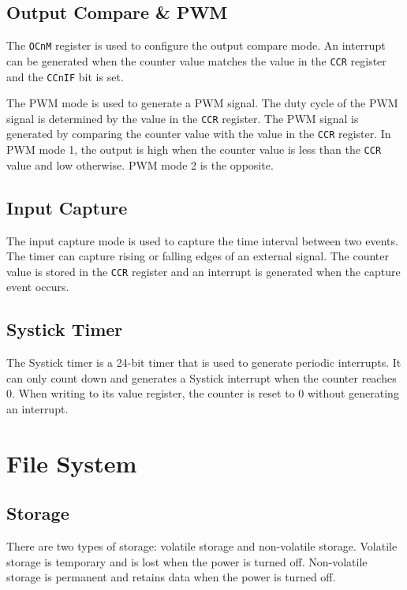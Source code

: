 \documentclass[a4paper,12pt]{article}
\begin{document}
\subsection{Output Compare \& PWM}

The \texttt{OCnM} register is used to configure the output compare mode. An interrupt can be generated when the counter value matches the value in the \texttt{CCR} register and the \texttt{CCnIF} bit is set.

The PWM mode is used to generate a PWM signal. The duty cycle of the PWM signal is determined by the value in the \texttt{CCR} register. The PWM signal is generated by comparing the counter value with the value in the \texttt{CCR} register. In PWM mode 1, the output is high when the counter value is less than the \texttt{CCR} value and low otherwise. PWM mode 2 is the opposite.

\subsection{Input Capture}

The input capture mode is used to capture the time interval between two events. The timer can capture rising or falling edges of an external signal. The counter value is stored in the \texttt{CCR} register and an interrupt is generated when the capture event occurs.

\subsection{Systick Timer}

The Systick timer is a 24-bit timer that is used to generate periodic interrupts. It can only count down and generates a Systick interrupt when the counter reaches 0. When writing to its value register, the counter is reset to 0 without generating an interrupt.

\section{File System}

\subsection{Storage}

There are two types of storage: volatile storage and non-volatile storage. Volatile storage is temporary and is lost when the power is turned off. Non-volatile storage is permanent and retains data when the power is turned off.
\end{document}

